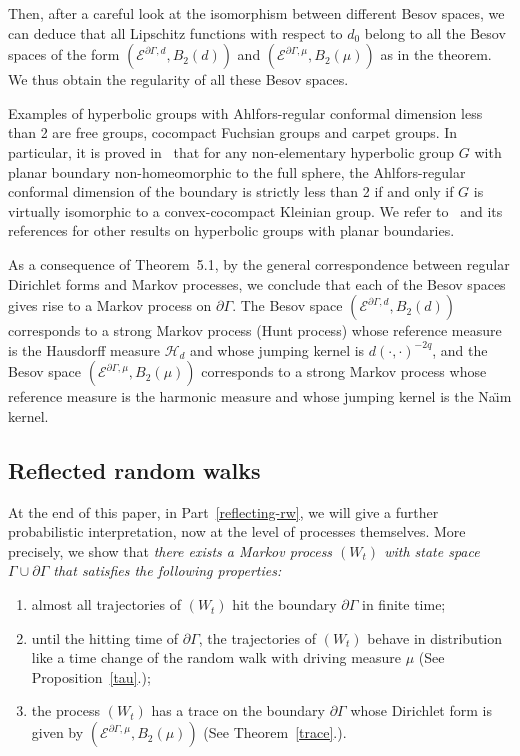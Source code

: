 \documentclass[10pt]{amsart}
\theoremstyle{definition}\newtheorem{defi}[theo]{Definition}\newtheorem{rema}[theo]{Remark}\newtheorem{exam}[theo]{Example}\newtheorem{exem}[theo]{Example}\newtheorem{nota}[theo]{Notation}
\newcommand{\ce}{\mathcal{E}}
\newcommand{\ch}{\mathcal{H}}
\newcommand*{\romanenumi}{\renewcommand*{\theenumi}{\roman{enumi}}}
\begin{document}
Then, after a careful look at the isomorphism between different Besov spaces, we can deduce that all Lipschitz functions with respect to $d_0$ belong to all the Besov spaces of the form $(\ce^{\partial\Gamma,d},B_2(d))$ and $(\ce^{\partial\Gamma,\mu},B_2(\mu))$ as in the theorem. We thus obtain the regularity of all these Besov spaces.



Examples of hyperbolic groups with Ahlfors-regular conformal dimension less than 2 are free groups, cocompact Fuchsian groups and carpet groups. In particular, it is proved in~\cite{Ha1} that for any non-elementary hyperbolic group $G$ with planar boundary non-homeomorphic to the full sphere, the Ahlfors-regular conformal dimension of the boundary is strictly less than 2 if and only if $G$ is virtually isomorphic to a convex-cocompact Kleinian group. We refer to~\cite{Ha1} and its references for other results on hyperbolic groups with planar boundaries.



As a consequence of Theorem~5.1, by the general correspondence between regular Dirichlet forms and Markov processes, we conclude that each of the Besov spaces gives rise to a Markov process on $\partial \Gamma$. The Besov space $(\ce^{\partial\Gamma,d},B_2(d))$ corresponds to a strong Markov process (Hunt process) whose reference measure is the Hausdorff measure $\ch_{d}$ and whose jumping kernel is $d(\cdot,\cdot)^{-2q}$, and the Besov space $(\ce^{\partial\Gamma,\mu},B_2(\mu))$ corresponds to a strong Markov process whose reference measure is the harmonic measure and whose jumping kernel is the Na{\"\i}m kernel. 



\subsection*{Reflected random walks}

At the end of this paper, in Part~\ref{reflecting-rw}, we will give a further probabilistic interpretation, now at the level of processes themselves. More precisely, we show that \emph{there exists a Markov process $(W_t)$ with state space $\Gamma\cup\partial\Gamma$ that satisfies the following properties:}
\begin{enumerate}\romanenumi
\item almost all trajectories of $(W_t)$ hit the boundary $\partial\Gamma$ in finite time;

\item until the hitting time of $\partial\Gamma$, the trajectories of $(W_t)$ behave in distribution like a time change of the random walk with driving measure $\mu$ (See Proposition~\ref{tau}.);

\item the process $(W_t)$ has a trace on the boundary $\partial\Gamma$ whose Dirichlet form is given by $(\ce^{\partial\Gamma,\mu},B_2(\mu))$ (See Theorem~\ref{trace}.).
\end{enumerate}
\end{document}
